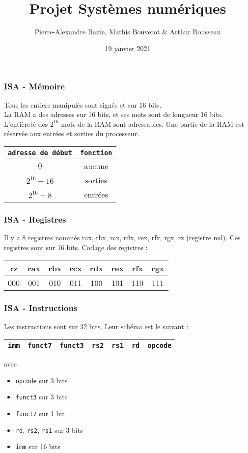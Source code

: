 \documentclass[xcolor=pst,10pt,onlymath]{beamer}
\author{Pierre-Alexandre Bazin, Mathis Bouverot \& Arthur Rousseau}
\title{Projet Systèmes numériques}
\date{19 janvier 2021}
\begin{document}
\frame{\titlepage}


\Large
\begin{frame}
    \frametitle{ISA - Mémoire}
    Tous les entiers manipulés sont signés et sur 16 bits.\\
    La RAM a des adresses sur 16 bits, et ses mots sont de longueur 16 bits.
    L'entièreté des $2^{16}$ mots de la RAM sont adressables. 
    Une partie de la RAM est réservée aux entrées et sorties du processeur.
    \begin{center}
    \begin{tabular}{|c|c|}
        \hline
        \texttt{adresse de début} & \texttt{fonction} \\
        \hline
        $0$ & aucune \\
        \hline
        $2^{16}-16$ & sorties \\
        \hline    
        $2^{16}-8$ & entrées \\
        \hline
    \end{tabular}
\end{center}
\end{frame}


\begin{frame}
    \frametitle{ISA - Registres}
    Il y a 8 registres nommés rax, rbx, rcx, rdx, rex, rfx, rgx, rz (registre nul).
    Ces registres sont sur 16 bits. 
    Codage des registres :
    \begin{center}
    \begin{tabular}{|c|c|c|c|c|c|c|c|}
        \hline
        rz  & rax & rbx & rcx & rdx & rex & rfx & rgx \\
        \hline
        000 & 001 & 010 & 011 & 100 & 101 & 110 & 111 \\
        \hline  
    \end{tabular}
\end{center}
\end{frame}


\begin{frame}
    \frametitle{ISA - Instructions}
    Les instructions sont sur 32 bits. Leur schéma est le suivant :
    \begin{center}
    \begin{tabular}{|c|c|c|c|c|c|c|}
        \hline
        \texttt{imm} & \texttt{funct7} & \texttt{funct3} & \texttt{rs2} & \texttt{rs1} & \texttt{rd} & \texttt{opcode} \\
        \hline
    \end{tabular}
    \end{center}
    avec \begin{itemize}
        \item \texttt{opcode} sur 3 bits
        \item \texttt{funct3} sur 3 bits
        \item \texttt{funct7} sur 1 bit 
        \item \texttt{rd}, \texttt{rs2}, \texttt{rs1} sur 3 bits
        \item \texttt{imm} sur 16 bits
    \end{itemize}
\end{frame}
\end{document}
